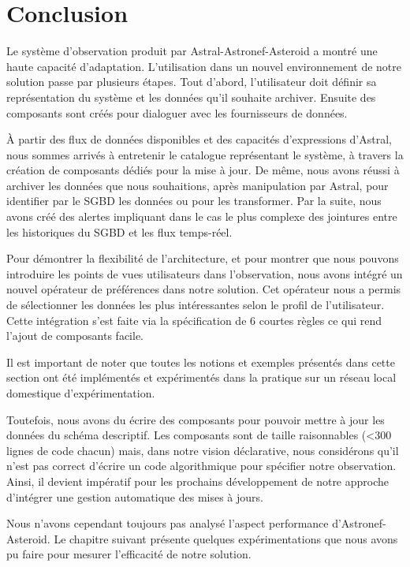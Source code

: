 \section{Conclusion}\label{sec:valid:domvision:conclusion}
Le système d'observation produit par Astral-Astronef-Asteroid a montré une haute capacité d'adaptation. L'utilisation dans un nouvel environnement de notre solution passe par plusieurs étapes. Tout d'abord, l'utilisateur doit définir sa représentation du système et les données qu'il souhaite archiver. Ensuite des composants sont créés pour dialoguer avec les fournisseurs de données. 

À partir des flux de données disponibles et des capacités d'expressions d'Astral, nous sommes arrivés à entretenir le catalogue représentant le système, à travers la création de composants dédiés pour la mise à jour. De même, nous avons réussi à archiver les données que nous souhaitions, après manipulation par Astral, pour identifier par le SGBD les données ou pour les transformer. Par la suite, nous avons créé des alertes impliquant dans le cas le plus complexe des jointures entre les historiques du SGBD et les flux temps-réel.

Pour démontrer la flexibilité de l'architecture, et pour montrer que nous pouvons introduire les points de vues utilisateurs dans l'observation, nous avons intégré un nouvel opérateur de préférences dans notre solution. Cet opérateur nous a permis de sélectionner les données les plus intéressantes selon le profil de l'utilisateur. Cette intégration s'est faite via la spécification de 6 courtes règles ce qui rend l'ajout de composants facile.

Il est important de noter que toutes les notions et exemples présentés dans cette section ont été implémentés et expérimentés dans la pratique sur un réseau local domestique d'expérimentation.

Toutefois, nous avons du écrire des composants pour pouvoir mettre à jour les données du schéma descriptif. Les composants sont de taille raisonnables (<300 lignes de code chacun) mais, dans notre vision déclarative, nous considérons qu'il n'est pas correct d'écrire un code algorithmique pour spécifier notre observation. Ainsi, il devient impératif pour les prochains développement de notre approche d'intégrer une gestion automatique des mises à jours.

Nous n'avons cependant toujours pas analysé l'aspect performance d'Astronef-Asteroid. Le chapitre suivant présente quelques expérimentations que nous avons pu faire pour mesurer l'efficacité de notre solution.